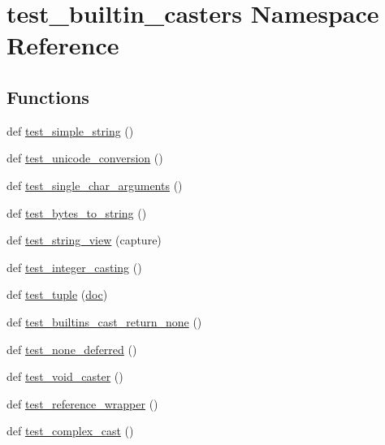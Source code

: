 \hypertarget{namespacetest__builtin__casters}{}\section{test\+\_\+builtin\+\_\+casters Namespace Reference}
\label{namespacetest__builtin__casters}
\subsection*{Functions}
\begin{DoxyCompactItemize}
\item 
def \mbox{\hyperlink{namespacetest__builtin__casters_a5bb94d5c10c4c6b222555d7c70525ba9}{test\+\_\+simple\+\_\+string}} ()
\item 
def \mbox{\hyperlink{namespacetest__builtin__casters_aced76e5b786549b7843b689949a5bd24}{test\+\_\+unicode\+\_\+conversion}} ()
\item 
def \mbox{\hyperlink{namespacetest__builtin__casters_af767b1b2bfd065cf9cb5edb40b27d431}{test\+\_\+single\+\_\+char\+\_\+arguments}} ()
\item 
def \mbox{\hyperlink{namespacetest__builtin__casters_a80708f5886882d14233ea6c00b491fdd}{test\+\_\+bytes\+\_\+to\+\_\+string}} ()
\item 
def \mbox{\hyperlink{namespacetest__builtin__casters_ae0904fa5521ec9fe9d94e44e59bda883}{test\+\_\+string\+\_\+view}} (capture)
\item 
def \mbox{\hyperlink{namespacetest__builtin__casters_a9e6969bd263ef047ae9a220f35ff4225}{test\+\_\+integer\+\_\+casting}} ()
\item 
def \mbox{\hyperlink{namespacetest__builtin__casters_a6077d301b56916ab81a4221c208113dd}{test\+\_\+tuple}} (\mbox{\hyperlink{structdoc}{doc}})
\item 
def \mbox{\hyperlink{namespacetest__builtin__casters_acc113e89eecd8ba4326fb07e3a2fb069}{test\+\_\+builtins\+\_\+cast\+\_\+return\+\_\+none}} ()
\item 
def \mbox{\hyperlink{namespacetest__builtin__casters_addc4bcd47ab0fab97ed61d5d8ff26b1b}{test\+\_\+none\+\_\+deferred}} ()
\item 
def \mbox{\hyperlink{namespacetest__builtin__casters_a63c920b715170a4c06f357e3c8c704c2}{test\+\_\+void\+\_\+caster}} ()
\item 
def \mbox{\hyperlink{namespacetest__builtin__casters_ab4739375a69546aec3a73882e721e49f}{test\+\_\+reference\+\_\+wrapper}} ()
\item 
def \mbox{\hyperlink{namespacetest__builtin__casters_a1335b48e53f6b611e1406f26ecabf6ef}{test\+\_\+complex\+\_\+cast}} ()

\end{DoxyCompactItemize}

